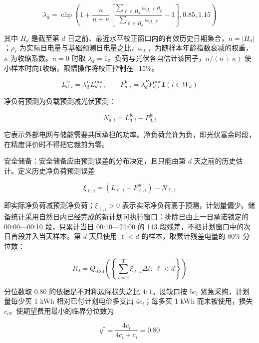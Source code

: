 \documentclass[12pt,a4paper]{ctexart}
\begin{document}
\begin{equation}
\lambda_d=\operatorname{clip}\left(1+\frac{n}{n+\kappa}\left[\frac{\sum_{\ell\in H_d}\omega_{d,\ell}\rho_\ell}{\sum_{\ell\in H_d}\omega_{d,\ell}}-1\right],0.85,1.15\right)
\end{equation}

其中 $H_d$ 是截至第 $d$ 日之前、最近水平校正窗口内的有效历史日期集合，$n=|H_d|$；$\rho_\ell$ 为实际日电量与基础预测日电量之比，$\omega_{d,\ell}$ 为随样本年龄指数衰减的权重，$\kappa$ 为收缩系数。$n=0$ 时取 $\lambda_d=1$。负荷与光伏各自估计该因子，$n/(n+\kappa)$ 使小样本时向1收缩，限幅操作将校正控制在$\pm$15\%。

\begin{equation}
L_{d,i}^{\mathrm{fc}}=\lambda_d^L L_{d,i}^{\mathrm{raw}},\qquad P_{d,i}^{\mathrm{fc}}=\lambda_d^P P_{d,i}^{\mathrm{raw}}\mathbf1(i\in W_d)
\end{equation}

净负荷预测为负载预测减光伏预测：

\begin{equation}
N_{d,i}=L_{d,i}^{\mathrm{fc}}-P_{d,i}^{\mathrm{fc}}
\end{equation}

它表示外部电网与储能需要共同承担的功率。净负荷允许为负，即光伏富余时段，在精度评价时不得把它裁剪为零。

安全储备：安全储备应由预测误差的分布决定，且只能由第 $d$ 天之前的历史估计。定义历史净负荷预测误差

\begin{equation}
\xi_{\ell,i}=\left(L_{\ell,i}-P_{\ell,i}^{\mathrm{act}}\right)-N_{\ell,i}
\end{equation}

即实际净负荷减预测净负荷；$\xi_{\ell,i}>0$ 表示实际净负荷高于预测，计划量偏少。储备统计采用自然日内已经完成的新计划可执行窗口：排除已由上一日承诺锁定的 00:00—00:10 段，只累计当日 00:10—24:00 的 143 段残差，不把计划窗口中的次日首段并入当天样本。第 $d$ 天只使用 $\ell<d$ 的样本，取累计残差电量的 80\% 分位数：

\begin{equation}
R_d=Q_{0.80}\left(\left\{\sum_{i=2}^{T}\xi_{\ell,i}\Delta t:\ \ell<d\right\}\right)
\end{equation}

分位数取 0.80 的依据是不对称边际损失之比 $4:1$。设缺口按 $5c_i$ 紧急采购，计划量每少买 1 kWh 相对已付计划电价多支出 $4c_i$；每多买 1 kWh 而未被使用，损失 $c_i$。使期望费用最小的临界分位数为

\begin{equation}
q^{*}=\frac{4c_i}{4c_i+c_i}=0.80
\end{equation}
\end{document}

